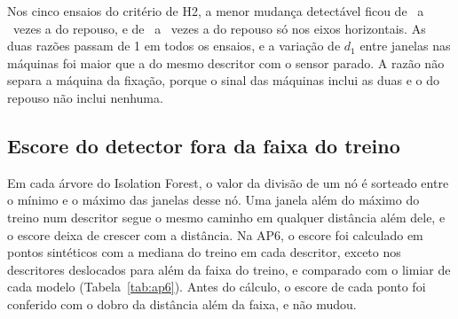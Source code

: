 Nos cinco ensaios do critério de H2, a menor mudança detectável ficou de \apCincoRazaoMin\ a \apCincoRazaoMax\ vezes a do repouso, e de \apCincoRazaoHorizontalMin\ a \apCincoRazaoHorizontalMax\ vezes a do repouso só nos eixos horizontais. As duas razões passam de 1 em todos os ensaios, e a variação de $d_1$ entre janelas nas máquinas foi maior que a do mesmo descritor com o sensor parado. A razão não separa a máquina da fixação, porque o sinal das máquinas inclui as duas e o do repouso não inclui nenhuma.

\subsection{Escore do detector fora da faixa do treino}\label{sec:res-ap6}

Em cada árvore do Isolation Forest, o valor da divisão de um nó é sorteado entre o mínimo e o máximo das janelas desse nó. Uma janela além do máximo do treino num descritor segue o mesmo caminho em qualquer distância além dele, e o escore deixa de crescer com a distância. Na AP6, o escore foi calculado em pontos sintéticos com a mediana do treino em cada descritor, exceto nos descritores deslocados para além da faixa do treino, e comparado com o limiar de cada modelo (Tabela~\ref{tab:ap6}). Antes do cálculo, o escore de cada ponto foi conferido com o dobro da distância além da faixa, e não mudou.

